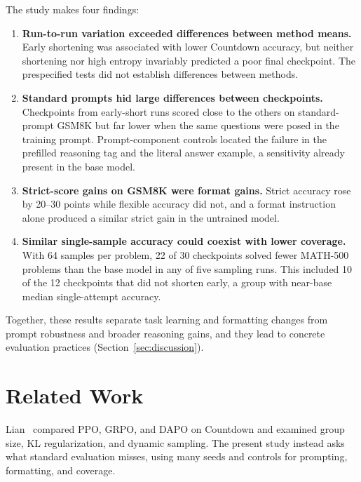 \documentclass[ai,article,submit,oneauthor]{Definitions/mdpi}
\begin{document}
The study makes four findings:
\begin{enumerate}
\item \textbf{Run-to-run variation exceeded differences between method means.} Early shortening was associated with lower Countdown accuracy, but neither shortening nor high entropy invariably predicted a poor final checkpoint. The prespecified tests did not establish differences between methods.
\item \textbf{Standard prompts hid large differences between checkpoints.} Checkpoints from early-short runs scored close to the others on standard-prompt GSM8K but far lower when the same questions were posed in the training prompt. Prompt-component controls located the failure in the prefilled reasoning tag and the literal answer example, a sensitivity already present in the base model.
\item \textbf{Strict-score gains on GSM8K were format gains.} Strict accuracy rose by 20--30 points while flexible accuracy did not, and a format instruction alone produced a similar strict gain in the untrained model.
\item \textbf{Similar single-sample accuracy could coexist with lower coverage.} With 64 samples per problem, 22 of 30 checkpoints solved fewer MATH-500 problems than the base model in any of five sampling runs. This included 10 of the 12 checkpoints that did not shorten early, a group with near-base median single-attempt accuracy.
\end{enumerate}
Together, these results separate task learning and formatting changes from prompt robustness and broader reasoning gains, and they lead to concrete evaluation practices (Section~\ref{sec:discussion}).

\section{Related Work}\label{sec:related}

Lian~\cite{lian2025comparative} compared PPO, GRPO, and DAPO on Countdown and examined group size, KL regularization, and dynamic sampling. The present study instead asks what standard evaluation misses, using many seeds and controls for prompting, formatting, and coverage.
\end{document}
